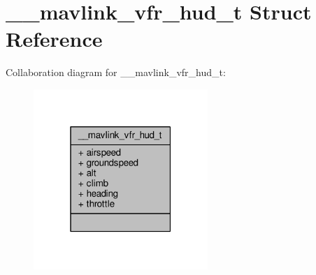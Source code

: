 \hypertarget{struct____mavlink__vfr__hud__t}{\section{\+\_\+\+\_\+mavlink\+\_\+vfr\+\_\+hud\+\_\+t Struct Reference}
\label{struct____mavlink__vfr__hud__t}
}


Collaboration diagram for \+\_\+\+\_\+mavlink\+\_\+vfr\+\_\+hud\+\_\+t\+:
\nopagebreak
\begin{figure}[H]
\begin{center}
\leavevmode
\includegraphics[width=187pt]{struct____mavlink__vfr__hud__t__coll__graph}
\end{center}
\end{figure}
